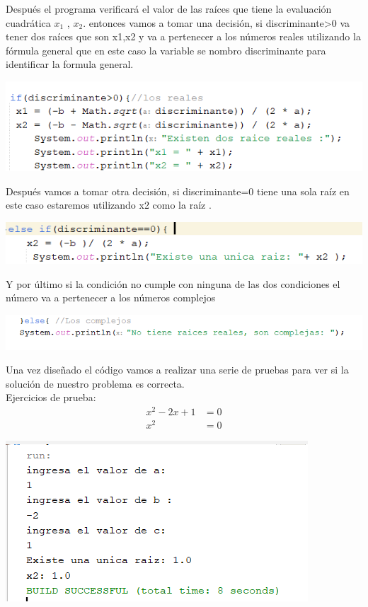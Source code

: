 \documentclass{IEEEcsmag}
\begin{document}
\begin{enumerate}
    Después el programa verificará el valor  de las raíces  que tiene la evaluación cuadrática $x_{1}$ , $x_{2}$.  entonces vamos a tomar una decisión,  si discriminante>0 va tener dos raíces que son x1,x2 y va a pertenecer a los números reales utilizando la fórmula general que en este caso la variable se nombro discriminante para identificar la formula general.
    
   
        \centering
        \includegraphics[width=0.5\linewidth]{./latex_imagenes/reales.png}
    
    Después vamos a tomar otra decisión,  si discriminante=0 tiene una sola raíz   en este caso estaremos  utilizando x2 como la raíz .
    
        \centering
        \includegraphics[width=0.5\linewidth]{./latex_imagenes/una raiz.png}

    Y por último si la condición no cumple con ninguna de las dos condiciones el número va a pertenecer a los números complejos
    
        \centering
        \includegraphics[width=0.5\linewidth]{./latex_imagenes/complejos.png}

    Una vez diseñado el código vamos a realizar una serie de pruebas para ver si la solución de nuestro problema es correcta.\\
    Ejercicios de prueba:
    \begin{align*}
    x^{2} - 2x + 1 &= 0\\
    x^{2} &= 0
    \end{align*}
  
        \centering
        \includegraphics[width=0.5\linewidth]{./latex_imagenes/prueba1.png}
    

\end{enumerate}
\end{document}
